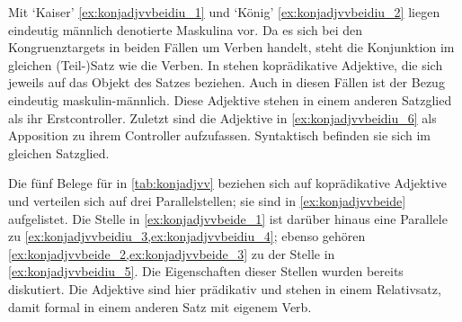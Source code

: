 Mit  `Kaiser' \cref{ex:konjadjvvbeidiu_1} und 
`König' \cref{ex:konjadjvvbeidiu_2} liegen eindeutig männlich
denotierte Maskulina vor. Da es sich bei den Kongruenztargets in beiden Fällen
um Verben handelt, steht die Konjunktion im gleichen (Teil-)Satz wie die
Verben. In  stehen
koprädikative Adjektive, die sich jeweils auf das Objekt des Satzes beziehen.
Auch in diesen Fällen ist der Bezug eindeutig maskulin-männlich. Diese
Adjektive stehen in einem anderen Satzglied als ihr Erstcontroller. Zuletzt
sind die Adjektive in \cref{ex:konjadjvvbeidiu_6} als Apposition zu ihrem
Controller aufzufassen. Syntaktisch befinden sie sich im gleichen Satzglied.

Die fünf Belege für  in \cref{tab:konjadjvv} beziehen sich auf
koprädikative Adjektive und verteilen sich auf drei Parallelstellen; sie sind
in \cref{ex:konjadjvvbeide} aufgelistet. Die Stelle in
\cref{ex:konjadjvvbeide_1} ist darüber hinaus eine Parallele zu
\cref{ex:konjadjvvbeidiu_3,ex:konjadjvvbeidiu_4}; ebenso gehören
\cref{ex:konjadjvvbeide_2,ex:konjadjvvbeide_3} zu der Stelle in
\cref{ex:konjadjvvbeidiu_5}. Die Eigenschaften dieser Stellen wurden bereits
diskutiert. Die Adjektive sind hier prädikativ und stehen in einem Relativsatz,
damit formal in einem anderen Satz mit eigenem Verb.

